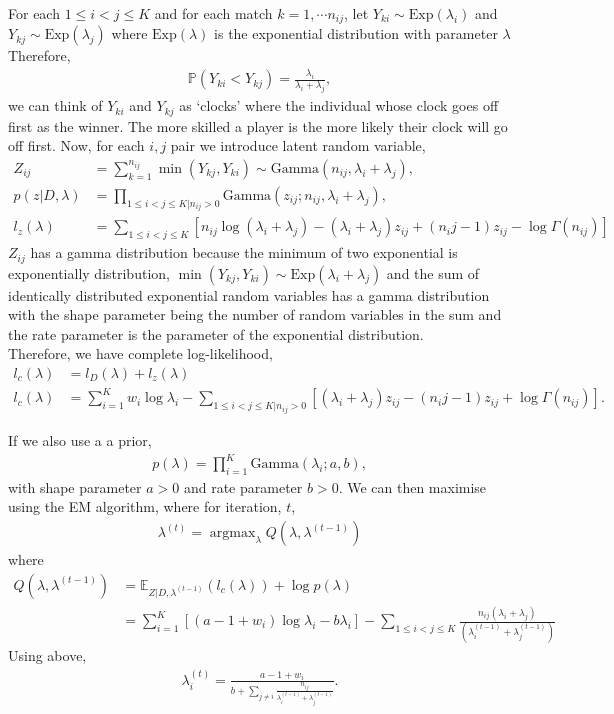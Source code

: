 \documentclass[11pt]{article}
\DeclareMathOperator*{\argmax}{argmax}
\numberwithin{equation}{section}
\begin{document}
For each $1 \leq i<j \leq K$ and for each match $k=1, \cdots n_{ij}$, let $Y_{ki} \sim \mathrm{Exp} (\lambda_i)$ and $Y_{kj} \sim \mathrm{Exp}(\lambda_j)$ where $\mathrm{Exp}(\lambda)$ is the exponential distribution with parameter $\lambda$ Therefore, 
\begin{align}
\mathbb{P}(Y_{ki} < Y_{kj}) = \frac{\lambda_i}{\lambda_i + \lambda_j},
\end{align}
we can think of $Y_{ki}$ and $Y_{kj}$ as `clocks' where the individual whose clock goes off first as the winner. The more skilled a player is the more likely their clock will go off first. Now, for each $i,j$ pair we introduce latent random variable, 
\begin{align} \label{latentrv}
Z_{ij} &= \sum _{k=1}^{n_{ij}} \min (Y_{kj},Y_{ki}) \sim \mathrm{Gamma} (n_{ij}, \lambda _i + \lambda _j),\\
p(z|D,\lambda) &= \prod _{1 \leq i<j \leq K | n_{ij} >0} \mathrm{Gamma} (z_{ij} ; n_{ij}, \lambda_i + \lambda_j), \\
l_z(\lambda) &= \sum _{1 \leq i<j \leq K}[n_{ij}\log (\lambda_i + \lambda_j) - (\lambda_i + \lambda_j)z_{ij} + (n_ij -1)z_{ij} - \log \Gamma (n_{ij})]
\end{align}
$Z_{ij}$ has a gamma distribution because the minimum of two exponential  is exponentially distribution, $\min (Y_{kj},Y_{ki}) \sim \mathrm{Exp}(\lambda _i + \lambda _j)$ and the sum of identically distributed exponential random variables has a gamma distribution with the shape parameter being the number of random variables in the sum and the rate parameter is the parameter of the exponential distribution. \\ 

Therefore, we have complete log-likelihood, 
\begin{align}
l_c(\lambda) &= l_D(\lambda) + l_z(\lambda) \\
l_c(\lambda) &= \sum _{i=1}^K w_i\log \lambda_i - \sum _{1 \leq i<j \leq K | n_{ij} >0} [(\lambda_i + \lambda_j)z_{ij} - (n_ij -1)z_{ij} + \log \Gamma (n_{ij})].
\end{align}

If we also use a a prior, 
\begin{align}
p(\lambda) = \prod _{i=1}^K \mathrm{Gamma}(\lambda_i ; a,b),
\end{align}
with shape parameter $a>0$ and rate parameter $b>0$. We can then maximise using the EM algorithm, where for iteration, $t$,
\begin{align}
\lambda^{(t)} = \argmax _{\lambda} Q(\lambda,\lambda^{(t-1)})
\end{align}
where 
\begin{align}
Q(\lambda,\lambda^{(t-1)}) &= \mathbb{E}_{Z|D, \lambda^{(t-1)}} (l_c(\lambda)) + \log p(\lambda) \\
&= \sum _{i=1}^K[(a-1+w_i)\log \lambda_i -b\lambda_i] - \sum _{1 \leq i<j \leq K} \frac{n_{ij}(\lambda_i + \lambda_j)}{(\lambda_i^{(t-1)} + \lambda_j^{(t-1)})}
\end{align}
Using above, 
\begin{align}
\lambda_i ^{(t)} = \frac{a-1+w_i}{b + \sum_{j \neq i}\frac{n_{ij}}{\lambda_i^{(t-1)}+\lambda_j^{(t-1)}}}.
\end{align}
\end{document}
